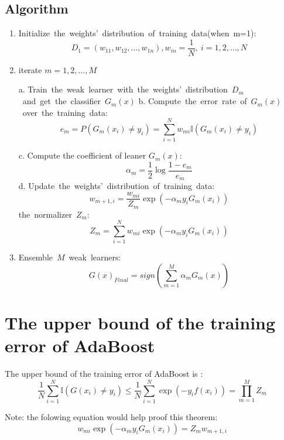 \subsection{Algorithm}
\begin{enumerate}
\item Initialize\ the\ weights'\ distribution\ of\ training\ data(when\ m=1):
\begin{equation}
D_1=(w_{11},w_{12},\dotsc,w_{1n}),w_{in}=\frac{1}{N},\ i=1,2,\dotsc,N
\end{equation}
\item iterate $m=1,2,\dotsc,M$


\subitem a. Train\ the\ weak\ learner\ with\ the\ weights'\ distribution\ $D_m$\ and\ get\ the\ classifier\ $G_m(x)$
\subitem b. Compute\ the\ error\ rate\ of\ $G_m(x)$\ over\ the\ training\ data:
\newline
\begin{equation}
e_m=P(G_m(x_i)\neq y_i)=\sum_{i=1}^N {w_{mi}\mathbb{I}(G_m(x_i)\neq y_i)}
\end{equation}

\subitem c. Compute the coefficient of leaner $G_m(x)$:
\begin{equation}
\alpha_m = \frac{1}{2}\log{\frac{1-e_m}{e_m}}
\end{equation}
\subitem d. Update\ the\ weights'\ distribution\ of\ training\ data:
\begin{equation}
w_{m+1,i}=\frac{w_{mi}}{Z_m}\exp(-\alpha_m y_i G_m(x_i))
\end{equation}
the\ normalizer\ $Z_m$:
\begin{equation}
Z_m=\sum_{i=1}^N w_{mi}\exp(-\alpha_m y_i G_m(x_i))
\end{equation}


\item Ensemble\ $M$\ weak\ learners:
\begin{equation}
G(x)_{Final}=sign(\sum_{m=1}^M \alpha_m G_m(x))
\end{equation}
\end{enumerate} 

\section{The upper bound of the training error of AdaBoost}
\begin{theorem}
The upper bound of the training error of AdaBoost is :
\begin{equation}
\frac{1}{N} \sum_{i=1}^N \mathbb{I}(G(x_i)\neq y_i) \leq \frac{1}{N} \sum_{i=1}^N \exp(-y_i f(x_i))=\prod_{m=1}^M Z_m
\end{equation}

Note: the folowing equation would help proof this theorem:
\begin{equation}
w_{mi}\exp(-\alpha_m y_i G_m(x_i))=Z_m w_{m+1,i}
\end{equation}
\end{theorem}
